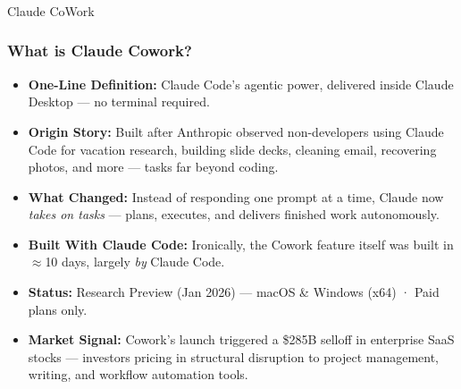 \begin{frame}[fragile]\frametitle{}

\begin{center}
{\Large Claude CoWork}
\end{center}
\end{frame}

\begin{frame}[fragile]\frametitle{What is Claude Cowork?}
  \begin{itemize}
    \item \textbf{One-Line Definition:} Claude Code's agentic power, delivered inside Claude Desktop — no terminal required.
    \item \textbf{Origin Story:} Built after Anthropic observed non-developers using Claude Code for vacation research, building slide decks, cleaning email, recovering photos, and more — tasks far beyond coding.
    \item \textbf{What Changed:} Instead of responding one prompt at a time, Claude now \textit{takes on tasks} — plans, executes, and delivers finished work autonomously.
    \item \textbf{Built With Claude Code:} Ironically, the Cowork feature itself was built in $\approx$10 days, largely \textit{by} Claude Code.
    \item \textbf{Status:} Research Preview (Jan 2026) — macOS \& Windows (x64) · Paid plans only.
    \item \textbf{Market Signal:} Cowork's launch triggered a \$285B selloff in enterprise SaaS stocks — investors pricing in structural disruption to project management, writing, and workflow automation tools.
  \end{itemize}
\end{frame}

